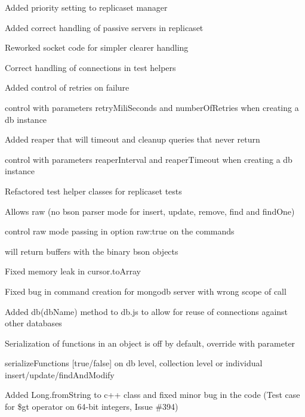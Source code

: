 \begin{DoxyItemize}
\item Added priority setting to replicaset manager
\item Added correct handling of passive servers in replicaset
\item Reworked socket code for simpler clearer handling
\item Correct handling of connections in test helpers
\item Added control of retries on failure
\begin{DoxyItemize}
\item control with parameters retry\+Mili\+Seconds and number\+Of\+Retries when creating a db instance
\end{DoxyItemize}
\item Added reaper that will timeout and cleanup queries that never return
\begin{DoxyItemize}
\item control with parameters reaper\+Interval and reaper\+Timeout when creating a db instance
\end{DoxyItemize}
\item Refactored test helper classes for replicaset tests
\item Allows raw (no bson parser mode for insert, update, remove, find and find\+One)
\begin{DoxyItemize}
\item control raw mode passing in option raw\+:true on the commands
\item will return buffers with the binary bson objects
\end{DoxyItemize}
\item Fixed memory leak in cursor.\+to\+Array
\item Fixed bug in command creation for mongodb server with wrong scope of call
\item Added db(db\+Name) method to db.\+js to allow for reuse of connections against other databases
\item Serialization of functions in an object is off by default, override with parameter
\begin{DoxyItemize}
\item serialize\+Functions \mbox{[}true/false\mbox{]} on db level, collection level or individual insert/update/find\+And\+Modify
\end{DoxyItemize}
\item Added Long.\+from\+String to c++ class and fixed minor bug in the code (Test case for \$gt operator on 64-\/bit integers, Issue \#394)

\end{DoxyItemize}
